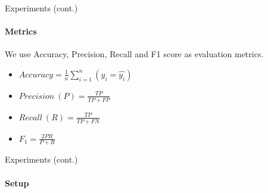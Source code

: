 \begin{frame}{Experiments (cont.)}
\framesubtitle{Metrics}

We use Accuracy, Precision, Recall and F1 score as evaluation metrics.
\begin{itemize}
\item $Accuracy  = \displaystyle\frac{1}{n}\sum_{i = 1}^n (y_i = \hat{y_i})$
\item $Precision\ (P) = \frac{TP}{TP + FP}$
\item $Recall\ (R) = \frac{TP}{TP + FN}$
\item $F_{1} = \frac{2PR}{P + R}$
\end{itemize}
\end{frame}

\begin{frame}{Experiments (cont.)}
\framesubtitle{Setup}
\end{frame}

